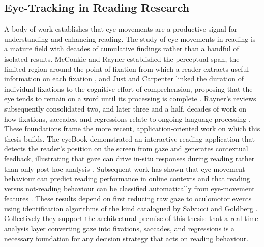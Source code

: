 \subsection{Eye-Tracking in Reading Research}
\label{subsec:related-eyetracking-reading}
A body of work establishes that eye movements are a productive signal for understanding and enhancing reading.
The study of eye movements in reading is a mature field with decades of cumulative findings rather than a handful of isolated results.
McConkie and Rayner established the perceptual span, the limited region around the point of fixation from which a reader extracts useful information on each fixation \cite{mcconkie1975span}, and Just and Carpenter linked the duration of individual fixations to the cognitive effort of comprehension, proposing that the eye tends to remain on a word until its processing is complete \cite{just1980reading}.
Rayner's reviews subsequently consolidated two, and later three and a half, decades of work on how fixations, saccades, and regressions relate to ongoing language processing \cite{rayner1998eyemovements, rayner2009eyemovements}.
These foundations frame the more recent, application-oriented work on which this thesis builds.
The eyeBook demonstrated an interactive reading application that detects the reader's position on the screen from gaze and generates contextual feedback, illustrating that gaze can drive in-situ responses during reading rather than only post-hoc analysis \cite{biedert2010eyebook}.
Subsequent work has shown that eye-movement behaviour can predict reading performance in online contexts \cite{guan2022predictive} and that reading versus not-reading behaviour can be classified automatically from eye-movement features \cite{landsmann2019classification}.
These results depend on first reducing raw gaze to oculomotor events using identification algorithms of the kind catalogued by Salvucci and Goldberg \cite{salvucci2000identifying}.
Collectively they support the architectural premise of this thesis: that a real-time analysis layer converting gaze into fixations, saccades, and regressions is a necessary foundation for any decision strategy that acts on reading behaviour.

